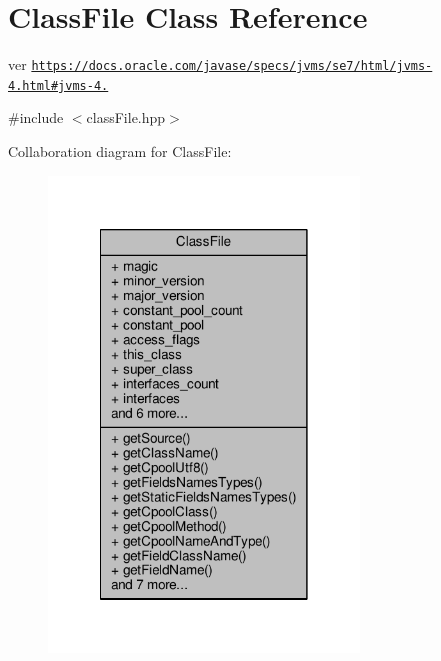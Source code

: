 \hypertarget{classClassFile}{\section{Class\+File Class Reference}
\label{classClassFile}
}


ver \href{https://docs.oracle.com/javase/specs/jvms/se7/html/jvms-4.html#jvms-4.4}{\tt https\+://docs.\+oracle.\+com/javase/specs/jvms/se7/html/jvms-\/4.\+html\#jvms-\/4.}  




{\ttfamily \#include $<$class\+File.\+hpp$>$}



Collaboration diagram for Class\+File\+:\nopagebreak
\begin{figure}[H]
\begin{center}
\leavevmode
\includegraphics[width=234pt]{classClassFile__coll__graph}
\end{center}
\end{figure}
